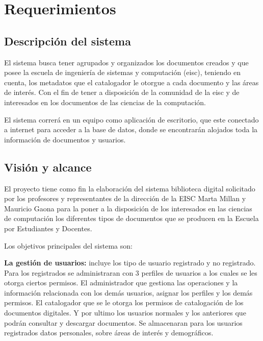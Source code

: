 \documentclass[11pt]{article}
\begin{document}
\section{Requerimientos}
        \subsection{Descripción del sistema}
        El sistema busca tener agrupados y organizados los documentos creados y que posee la
        escuela de ingeniería de sistemas y computación (eisc), teniendo en cuenta, los metadatos
        que el catalogador le otorgue a cada documento y las áreas de interés. Con el fin de tener
        a disposición de la comunidad de la eisc y de interesados en los documentos de las ciencias
        de la computación.
        
        El sistema correrá en un equipo como aplicación de escritorio, que este conectado a 
        internet para acceder a la base de datos, donde se encontrarán alojados toda la información
        de documentos y usuarios.
        
        \subsection{Visión y alcance}
        El proyecto tiene como fin la elaboración del sistema biblioteca digital solicitado por los
        profesores y representantes de la dirección de la EISC Marta Millan y Mauricio Gaona para
        la poner a la disposición de los interesados en las ciencias de computación los diferentes
        tipos de documentos que se producen en la Escuela por Estudiantes y Docentes.
        
        Los objetivos principales del sistema son:
        
        \textbf{La gestión de usuarios:} incluye los tipo de usuario registrado y no registrado.
        Para los registrados se administraran con 3 perfiles de usuarios a los cuales se les otorga
        ciertos permisos. El administrador que gestiona las operaciones y la información 
        relacionada con los demás usuarios, asignar los perfiles y los demás permisos. El 
        catalogador que se le otorga los permisos de catalogación de los documentos digitales. Y
        por ultimo los usuarios normales y los anteriores que podrán consultar y descargar
        documentos. Se almacenaran para los usuarios registrados datos personales, sobre áreas de 
        interés y demográficos.
        
\end{document}
